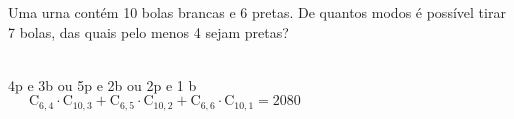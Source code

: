 \begin{ex}
 Uma urna contém 10 bolas brancas e 6 pretas. De quantos modos é possível tirar 7 bolas, das quais pelo menos 4 sejam pretas?
   \begin{sol}
       \phantom{A} \\
   4p e 3b ou 5p e 2b ou 2p e 1 b\\
   $\phantom{AA}\mathrm{C}_{6,4}\cdot  \mathrm{C}_{{10},3}+\mathrm{C}_{6,5}\cdot \mathrm{C}_{{10},2}+\mathrm{C}_{6,6}\cdot \mathrm{C}_{{10},1}=2080$
   
   \end{sol}
\end{ex}